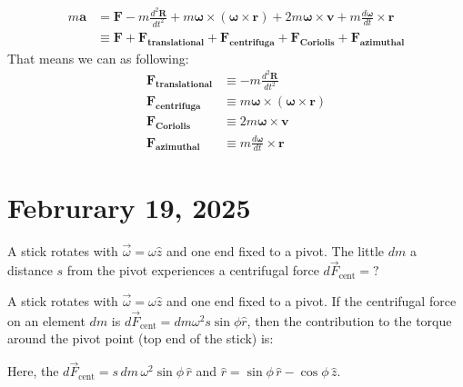 \documentclass[11pt]{article}
\begin{document}
\begin{equation}
	\begin{aligned}
		m\mathbf{a} & = \mathbf{F} - m\frac{d^2\mathbf{R}}{dt^2} + m\boldsymbol{\omega} \times (\boldsymbol{\omega} \times \mathbf{r}) + 2m\boldsymbol{\omega} \times \mathbf{v} + m\frac{d\boldsymbol{\omega}}{dt} \times \mathbf{r} \\
		            & \equiv \mathbf{F} + \mathbf{F_{translational}} + \mathbf{F_{centrifuga}} + \mathbf{F_{Coriolis}} + \mathbf{F_{azimuthal}}
	\end{aligned}\label{eq:10.10}
\end{equation}
That means we can  as following:
\begin{equation}
	\begin{aligned}
		\mathbf{F_{translational}} & \equiv -m\frac{d^2\mathbf{R}}{dt^2}                                        \\
		\mathbf{F_{centrifuga}}    & \equiv m\boldsymbol{\omega} \times (\boldsymbol{\omega} \times \mathbf{r}) \\
		\mathbf{F_{Coriolis}}      & \equiv 2m\boldsymbol{\omega} \times \mathbf{v}                             \\
		\mathbf{F_{azimuthal}}     & \equiv m\frac{d\boldsymbol{\omega}}{dt} \times \mathbf{r}
	\end{aligned}\label{eq:10.11}
\end{equation}


\section{Februrary 19, 2025}
\begin{example}
	A stick rotates with \(\vec{\omega} = \omega \hat{z}\) and one end fixed to a pivot. The little \(dm\) a distance \(s\) from the pivot experiences a centrifugal force \(d\vec{F}_{\text{cent}} = ?\)
\end{example}

\begin{example}
	A stick rotates with \(\vec{\omega} = \omega \hat{z}\) and one end fixed to a pivot. If the centrifugal force on an element \(dm\) is \(d\vec{F}_{\text{cent}} = dm \omega^2 s \sin\phi \hat{r}\), then the contribution to the torque around the pivot point (top end of the stick) is:
\end{example}
\begin{solution}
	Here, the \(d\vec{F}_{\text{cent}} = s \, dm \, \omega^2 \sin\phi \, \hat{r}\) and \(\hat{r} = \sin\phi \, \hat{r} - \cos\phi \, \hat{z}\).
\end{solution}
\end{document}
